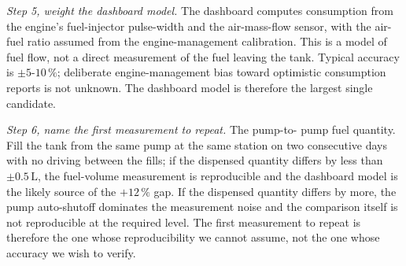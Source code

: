 \begin{exercise}
\textit{Step 5, weight the dashboard model.} The dashboard computes
consumption from the engine's fuel-injector pulse-width and the
air-mass-flow sensor, with the air-fuel ratio assumed from the
engine-management calibration. This is a model of fuel flow, not a
direct measurement of the fuel leaving the tank. Typical accuracy is
$\pm 5$-$10\,\%$; deliberate engine-management bias toward optimistic
consumption reports is not unknown. The dashboard model is therefore
the largest single candidate.

\textit{Step 6, name the first measurement to repeat.} The pump-to-
pump fuel quantity. Fill the tank from the same pump at the same
station on two consecutive days with no driving between the fills; if
the dispensed quantity differs by less than $\pm 0.5 \,\si{\liter}$,
the fuel-volume measurement is reproducible and the dashboard model
is the likely source of the $+12\,\%$ gap. If the dispensed quantity
differs by more, the pump auto-shutoff dominates the measurement noise
and the comparison itself is not reproducible at the required level.
The first measurement to repeat is therefore the one whose
reproducibility we cannot assume, not the one whose accuracy we wish
to verify.
\end{exercise}

